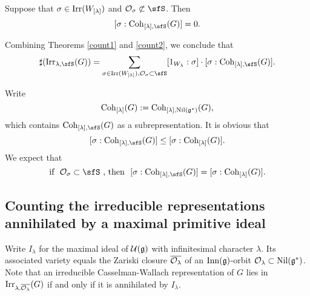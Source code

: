 \documentclass[counting_main.tex]{subfiles}
\begin{document}
\begin{prop}\label{count2}
Suppose that $\sigma\in  \mathrm{Irr}(W_{[\lambda]})$ and $\CO_\sigma\nsubset \sfS$. Then
  \[
    [\sigma: \Coh_{\Lam,\sfS}(G)]=0.
  \]

\end{prop}

Combining Theorems \ref{count1} and \ref{count2}, we conclude that
  \begin{equation}\label{leq2}
  \sharp(\Irr_{\lambda,\sfS}(G)) = \sum_{\sigma\in \Irr(W_\Lam), \CO_\sigma\subset \sfS} [1_{W_{\lambda}}: \sigma]\cdot [\sigma: \Coh_{\Lam,\sfS}(G)].
    \end{equation}

Write
\[
  \mathrm{Coh}_{{[\lambda]}}(G):= \mathrm{Coh}_{{[\lambda]},\mathrm{Nil}(\mathfrak g^*)}(G),
  \]
  which contains $ \Coh_{\Lam,\sfS}(G)$ as a subrepresentation. It is obvious that
  \begin{equation}\label{leq1}
    [\sigma: \Coh_{\Lam,\sfS}(G)]\leq [\sigma: \Coh_{\Lam}(G)].
  \end{equation}
  We expect that
   \begin{equation}\label{leq1}
  \textrm{if $\ \CO_\sigma\subset \sfS\ $, then  }\  [\sigma: \Coh_{\Lam,\sfS}(G)]= [\sigma: \Coh_{\Lam}(G)].
  \end{equation}







\subsection{Counting the irreducible representations annihilated by a maximal primitive ideal}
Write $I_\lambda$ for the maximal ideal of $\mathcal U(\mathfrak g)$ with infinitesimal character $\lambda$. Its associated variety equals the Zariski closure $\overline{{\mathcal {O}}_\lambda}$ of an $\mathrm{Inn}(\mathfrak g)$-orbit  ${\mathcal {O}}_\lambda\subset\mathrm{Nil}(\mathfrak g^*) $.  Note that an irreducible Casselman-Wallach representation of $G$ lies in $\mathrm{Irr}_{\lambda,\overline{{\mathcal {O}}_\lambda}}(G)$ if and only if it is annihilated by $I_\lambda$.
\end{document}
